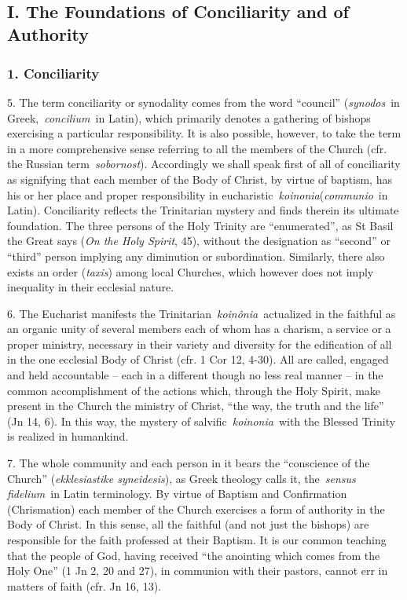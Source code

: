 ~

\subsection{I. The Foundations of Conciliarity and of
Authority}\label{i.-the-foundations-of-conciliarity-and-of-authority}

\subsubsection{1. Conciliarity}\label{conciliarity}

5. The term conciliarity or synodality comes from the word ``council''
(\emph{synodos}~in Greek,~\emph{concilium}~in Latin), which primarily
denotes a gathering of bishops exercising a particular responsibility.
It is also possible, however, to take the term in a more comprehensive
sense referring to all the members of the Church (cfr. the Russian
term~\emph{sobornost}). Accordingly we shall speak first of all of
conciliarity as signifying that each member of the Body of Christ, by
virtue of baptism, has his or her place and proper responsibility in
eucharistic~\emph{koinonia}(\emph{communio}~in Latin). Conciliarity
reflects the Trinitarian mystery and finds therein its ultimate
foundation. The three persons of the Holy Trinity are ``enumerated'', as
St Basil the Great says (\emph{On the Holy Spirit}, 45), without the
designation as ``second'' or ``third'' person implying any diminution or
subordination. Similarly, there also exists an order (\emph{taxis})
among local Churches, which however does not imply inequality in their
ecclesial nature.

6. The Eucharist manifests the Trinitarian~\emph{koinônia}~actualized in
the faithful as an organic unity of several members each of whom has a
charism, a service or a proper ministry, necessary in their variety and
diversity for the edification of all in the one ecclesial Body of Christ
(cfr. 1 Cor 12, 4-30). All are called, engaged and held accountable --
each in a different though no less real manner -- in the common
accomplishment of the actions which, through the Holy Spirit, make
present in the Church the ministry of Christ, ``the way, the truth and
the life'' (Jn 14, 6). In this way, the mystery of
salvific~\emph{koinonia}~with the Blessed Trinity is realized in
humankind.

7. The whole community and each person in it bears the ``conscience of
the Church'' (\emph{ekklesiastike syneidesis}), as Greek theology calls
it, the~\emph{sensus fidelium}~in Latin terminology. By virtue of
Baptism and Confirmation (Chrismation) each member of the Church
exercises a form of authority in the Body of Christ. In this sense, all
the faithful (and not just the bishops) are responsible for the faith
professed at their Baptism. It is our common teaching that the people of
God, having received ``the anointing which comes from the Holy One'' (1
Jn 2, 20 and 27), in communion with their pastors, cannot err in matters
of faith (cfr. Jn 16, 13).

